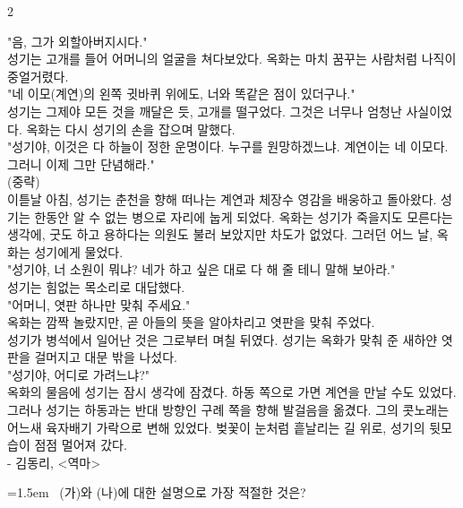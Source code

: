 \documentclass[10pt, a4paper]{article}
\begin{document}
\begin{multicols}{2}
\begin{passagebox}
"음, 그가 외할아버지시다." \\
성기는 고개를 들어 어머니의 얼굴을 쳐다보았다. 옥화는 마치 꿈꾸는 사람처럼 나직이 중얼거렸다. \\
"네 이모(계연)의 왼쪽 귓바퀴 위에도, 너와 똑같은 점이 있더구나." \\
성기는 그제야 모든 것을 깨달은 듯, 고개를 떨구었다. 그것은 너무나 엄청난 사실이었다. 옥화는 다시 성기의 손을 잡으며 말했다. \\
"성기야, 이것은 다 하늘이 정한 운명이다. 누구를 원망하겠느냐. 계연이는 네 이모다. 그러니 이제 그만 단념해라." \\
(중략) \\
이튿날 아침, 성기는 춘천을 향해 떠나는 계연과 체장수 영감을 배웅하고 돌아왔다. 성기는 한동안 알 수 없는 병으로 자리에 눕게 되었다. 옥화는 성기가 죽을지도 모른다는 생각에, 굿도 하고 용하다는 의원도 불러 보았지만 차도가 없었다. 그러던 어느 날, 옥화는 성기에게 물었다. \\
"성기야, 너 소원이 뭐냐? 네가 하고 싶은 대로 다 해 줄 테니 말해 보아라." \\
성기는 힘없는 목소리로 대답했다. \\
"어머니, 엿판 하나만 맞춰 주세요." \\
옥화는 깜짝 놀랐지만, 곧 아들의 뜻을 알아차리고 엿판을 맞춰 주었다. \\
성기가 병석에서 일어난 것은 그로부터 며칠 뒤였다. 성기는 옥화가 맞춰 준 새하얀 엿판을 걸머지고 대문 밖을 나섰다. \\
"성기야, 어디로 가려느냐?" \\
옥화의 물음에 성기는 잠시 생각에 잠겼다. 하동 쪽으로 가면 계연을 만날 수도 있었다. 그러나 성기는 하동과는 반대 방향인 구례 쪽을 향해 발걸음을 옮겼다. 그의 콧노래는 어느새 육자배기 가락으로 변해 있었다. 벚꽃이 눈처럼 흩날리는 길 위로, 성기의 뒷모습이 점점 멀어져 갔다.
\\[0.5em]
- 김동리, <역마>
\end{passagebox}
\vspace{1mm}

\noindent\begin{minipage}{\columnwidth}
\vspace{2mm}
{\hangindent=1.5em  ~(가)와 (나)에 대한 설명으로 가장 적절한 것은?\par}


\end{minipage}
\end{multicols}
\end{document}
